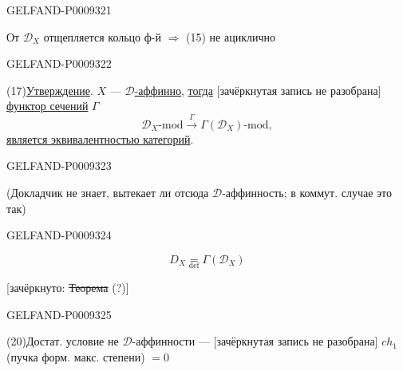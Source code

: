 \begin{GelfandAdjacentEvidence}{GELFAND-P000932}{1}

От $\mathcal D_X$ отщепляется кольцо ф-й $\Rightarrow$ (15) не ациклично
\end{GelfandAdjacentEvidence}
\begin{GelfandAdjacentEvidence}{GELFAND-P000932}{2}


(17)\quad \underline{Утверждение}. $X$ --- \underline{$\mathcal D$-аффинно}, \underline{тогда}
[зачёркнутая запись не разобрана] \underline{функтор сечений} $\Gamma$
\begin{equation*}
 \mathcal D_X\text{-mod}\overset{\Gamma}{\longrightarrow}\Gamma(\mathcal D_X)\text{-mod},
 \tag{18}
\end{equation*}
\underline{является эквивалентностью категорий}.
\end{GelfandAdjacentEvidence}
\begin{GelfandAdjacentEvidence}{GELFAND-P000932}{3}


(Докладчик не знает, вытекает ли отсюда $\mathcal D$-аффинность; в коммут. случае это так)
\end{GelfandAdjacentEvidence}
\begin{GelfandAdjacentEvidence}{GELFAND-P000932}{4}


\begin{equation*}
 D_X\underset{\mathrm{def}}{=}\Gamma(\mathcal D_X)
 \tag{19}
\end{equation*}

[зачёркнуто: \sout{Теорема} (?)]
\end{GelfandAdjacentEvidence}
\begin{GelfandAdjacentEvidence}{GELFAND-P000932}{5}


(20)\quad Достат. условие не $\mathcal D$-аффинности --- [зачёркнутая запись не разобрана] $ch_1$ (пучка форм. макс. степени) $=0$
\end{GelfandAdjacentEvidence}
